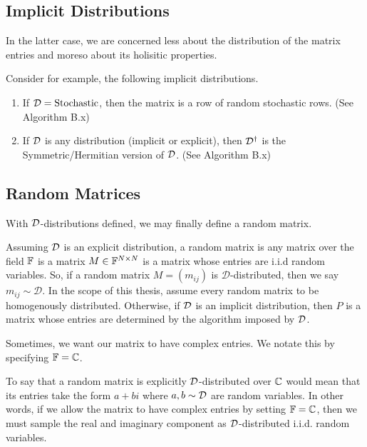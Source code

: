 
\subsection{Implicit Distributions}

In the latter case, we are concerned less about the distribution of the matrix entries and moreso about its holisitic properties.

Consider for example, the following implicit distributions.

\begin{enumerate}
\item If $\mathcal{D} = \text{Stochastic}$, then the matrix is a row of random stochastic rows. (See Algorithm B.x)
\item If $\mathcal{D}$ is any distribution (implicit or explicit), then $\mathcal{D}^{\dagger}$ is the Symmetric/Hermitian version of $\mathcal{D}$. (See Algorithm B.x)
\end{enumerate}


\subsection{Random Matrices}

With $\mathcal{D}$-distributions defined, we may finally define a random matrix.

\begin{definition}
Assuming $\mathcal{D}$ is an explicit distribution, a random matrix is any matrix over the field $\mathbb{F}$ is a matrix $M \in \mathbb{F}^{N \times N}$ is a matrix whose entries are i.i.d random variables. So, if a random matrix $M = (m_{ij})$ is $\mathcal{D}$-distributed, then we say $m_{ij} \sim \mathcal{D}$. In the scope of this thesis, assume every random matrix to be homogenously distributed. Otherwise, if $\mathcal{D}$ is an implicit distribution, then $P$ is a matrix whose entries are determined by the algorithm imposed by $\mathcal{D}$.
\end{definition}

\noindent Sometimes, we want our matrix to have complex entries. We notate this by specifying $\mathbb{F} = \mathbb{C}$.

\begin{remark}
To say that a random matrix is explicitly $\mathcal{D}$-distributed over $\mathbb{C}$ would mean that its entries take the form $a + bi$ where $a,b \sim \mathcal{D}$ are random variables. In other words, if we allow the matrix to have complex entries by setting $\mathbb{F} = \mathbb{C}$, then we must sample the real and imaginary component as $\mathcal{D}$-distributed i.i.d. random variables.
\end{remark}

